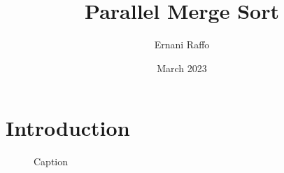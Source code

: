 \documentclass{article}
\title{Parallel Merge Sort}
\author{Ernani Raffo}
\date{March 2023}
\begin{document}
\maketitle

\section{Introduction}
\begin{figure}[h]
    \centering
    
    \caption{Caption}
    \label{fig:my_label}
\end{figure}
\end{document}
